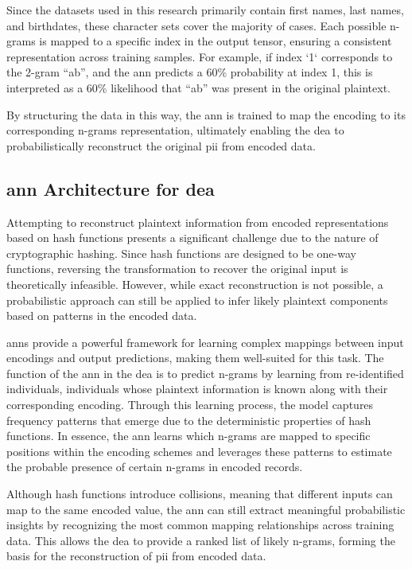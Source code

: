 Since the datasets used in this research primarily contain first names, last names, and birthdates, these character sets cover the majority of cases.
Each possible n-grams is mapped to a specific index in the output tensor, ensuring a consistent representation across training samples.
For example, if index `1` corresponds to the 2-gram \enquote{ab}, and the \ac{ann} predicts a 60\% probability at index 1, this is interpreted as a 60\% likelihood that \enquote{ab} was present in the original plaintext.

By structuring the data in this way, the \ac{ann} is trained to map the encoding to its corresponding n-grams representation, ultimately enabling the \ac{dea} to probabilistically reconstruct the original \ac{pii} from encoded data.

\subsection{\ac{ann} Architecture for \ac{dea}} \label{sec:architecture}

Attempting to reconstruct plaintext information from encoded representations based on hash functions presents a significant challenge due to the nature of cryptographic hashing.
Since hash functions are designed to be one-way functions, reversing the transformation to recover the original input is theoretically infeasible.
However, while exact reconstruction is not possible, a probabilistic approach can still be applied to infer likely plaintext components based on patterns in the encoded data.

\ac{ann}s provide a powerful framework for learning complex mappings between input encodings and output predictions, making them well-suited for this task.
The function of the \ac{ann} in the \ac{dea} is to predict n-grams by learning from re-identified individuals, individuals whose plaintext information is known along with their corresponding encoding.
Through this learning process, the model captures frequency patterns that emerge due to the deterministic properties of hash functions.
In essence, the \ac{ann} learns which n-grams are mapped to specific positions within the encoding schemes and leverages these patterns to estimate the probable presence of certain n-grams in encoded records.

Although hash functions introduce collisions, meaning that different inputs can map to the same encoded value, the \ac{ann} can still extract meaningful probabilistic insights by recognizing the most common mapping relationships across training data.
This allows the \ac{dea} to provide a ranked list of likely n-grams, forming the basis for the reconstruction of \ac{pii} from encoded data.

